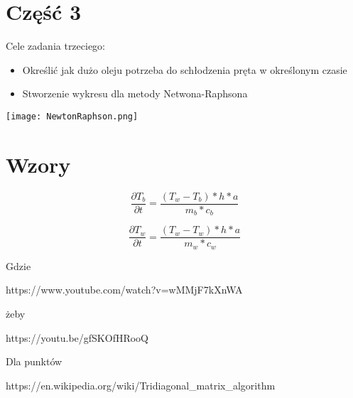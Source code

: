 \documentclass[varwidth,12pt,a4paper]{article}
\begin{document}
\section{Część 3}

Cele zadania trzeciego:

\begin{itemize}
  \item Określić jak dużo oleju potrzeba do schłodzenia pręta w określonym czasie
  \item Stworzenie wykresu dla metody Netwona-Raphsona
\end{itemize}

\texttt{[image: NewtonRaphson.png]} 




\section{Wzory}

\begin{equation}
    \frac{\partial T_b}{\partial t}=\frac{(T_w-T_b)*h*a}{m_b*c_b}
\end{equation}

\begin{equation}
    \frac{\partial T_w}{\partial t}=\frac{(T_w-T_w)*h*a}{m_w*c_w}
\end{equation}

Gdzie 

https://www.youtube.com/watch?v=wMMjF7kXnWA

żeby 

https://youtu.be/gfSKOfHRooQ



Dla punktów 

https://en.wikipedia.org/wiki/Tridiagonal_matrix_algorithm
\end{document}
